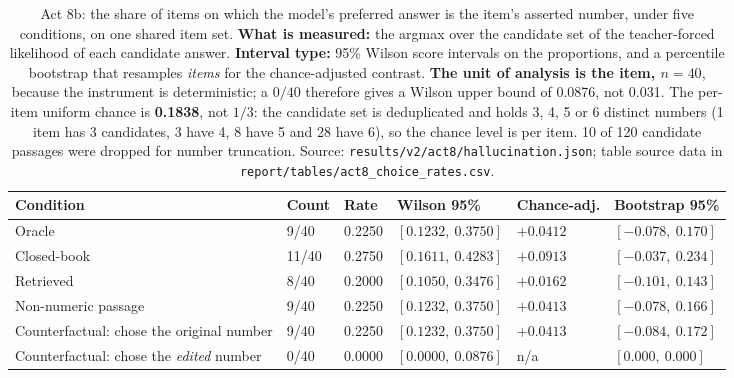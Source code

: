 \documentclass[11pt,a4paper]{article}
\begin{document}
\begin{table}[H]
\centering
\begin{tabular}{L{2.5cm}R{1.5cm}R{1.7cm}L{2.5cm}R{1.7cm}L{3.4cm}}
\toprule
Condition & Count & Rate & Wilson 95\% & Chance-adj. & Bootstrap 95\% \\
\midrule
Oracle & 9/40 & 0.2250 & $[0.1232,\ 0.3750]$ & $+0.0412$ & $[-0.078,\ 0.170]$ \\
Closed-book & 11/40 & 0.2750 & $[0.1611,\ 0.4283]$ & $+0.0913$ & $[-0.037,\ 0.234]$ \\
Retrieved & 8/40 & 0.2000 & $[0.1050,\ 0.3476]$ & $+0.0162$ & $[-0.101,\ 0.143]$ \\
Non-numeric passage & 9/40 & 0.2250 & $[0.1232,\ 0.3750]$ & $+0.0413$ & $[-0.078,\ 0.166]$ \\
\midrule
Counterfactual: chose the original number & 9/40 & 0.2250 & $[0.1232,\ 0.3750]$ & $+0.0413$ & $[-0.084,\ 0.172]$ \\
Counterfactual: chose the \emph{edited} number & 0/40 & 0.0000 & $[0.0000,\ 0.0876]$ & n/a & $[0.000,\ 0.000]$ \\
\bottomrule
\end{tabular}
\caption{Act 8b: the share of items on which the model's preferred answer is the
item's asserted number, under five conditions, on one shared item set.
\textbf{What is measured:} the argmax over the candidate set of the
teacher-forced likelihood of each candidate answer. \textbf{Interval type:}
95\% Wilson score intervals on the proportions, and a percentile bootstrap that
resamples \emph{items} for the chance-adjusted contrast. \textbf{The unit of
analysis is the item, $n = 40$}, because the instrument is deterministic; a
$0/40$ therefore gives a Wilson upper bound of 0.0876, not 0.031. The
per-item uniform chance is \textbf{0.1838}, not $1/3$: the candidate set is
deduplicated and holds 3, 4, 5 or 6 distinct numbers (1 item has 3 candidates,
3 have 4, 8 have 5 and 28 have 6), so the chance level is per item. 10 of 120
candidate passages were dropped for number truncation. Source:
\texttt{results/v2/act8/hallucination.json}; table source data in
\texttt{report/tables/act8\_choice\_rates.csv}.}
\label{tab:act8b}
\end{table}
\end{document}
